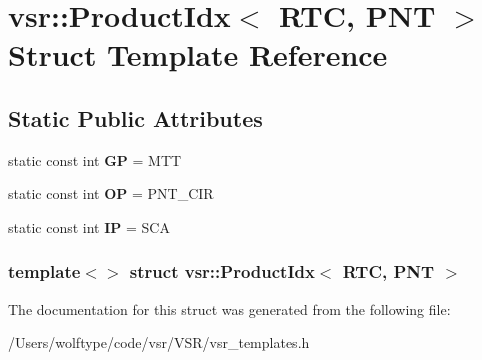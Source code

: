 \hypertarget{structvsr_1_1_product_idx_3_01_r_t_c_00_01_p_n_t_01_4}{\section{vsr\-:\-:Product\-Idx$<$ R\-T\-C, P\-N\-T $>$ Struct Template Reference}
\label{structvsr_1_1_product_idx_3_01_r_t_c_00_01_p_n_t_01_4}
}
\subsection*{Static Public Attributes}
\begin{DoxyCompactItemize}
\item 
\hypertarget{structvsr_1_1_product_idx_3_01_r_t_c_00_01_p_n_t_01_4_a8c1e9a2382d3fbc09e400bb3415e14af}{static const int {\bfseries G\-P} = M\-T\-T}\label{structvsr_1_1_product_idx_3_01_r_t_c_00_01_p_n_t_01_4_a8c1e9a2382d3fbc09e400bb3415e14af}

\item 
\hypertarget{structvsr_1_1_product_idx_3_01_r_t_c_00_01_p_n_t_01_4_ac78276325f59328c196c944efb1ef033}{static const int {\bfseries O\-P} = P\-N\-T\-\_\-\-C\-I\-R}\label{structvsr_1_1_product_idx_3_01_r_t_c_00_01_p_n_t_01_4_ac78276325f59328c196c944efb1ef033}

\item 
\hypertarget{structvsr_1_1_product_idx_3_01_r_t_c_00_01_p_n_t_01_4_aa0956ee460af8d5b7da0e77a1e23da07}{static const int {\bfseries I\-P} = S\-C\-A}\label{structvsr_1_1_product_idx_3_01_r_t_c_00_01_p_n_t_01_4_aa0956ee460af8d5b7da0e77a1e23da07}

\end{DoxyCompactItemize}
\subsubsection*{template$<$$>$ struct vsr\-::\-Product\-Idx$<$ R\-T\-C, P\-N\-T $>$}



The documentation for this struct was generated from the following file\-:\begin{DoxyCompactItemize}
\item 
/\-Users/wolftype/code/vsr/\-V\-S\-R/vsr\-\_\-templates.\-h\end{DoxyCompactItemize}
